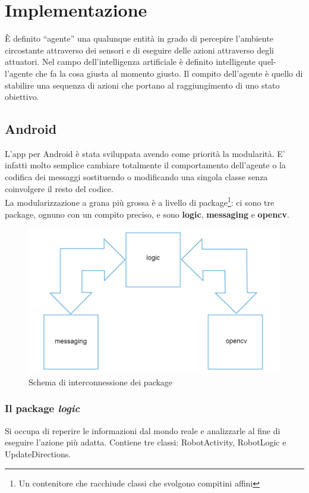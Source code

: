 \chapter{Implementazione}
\fancyfoot[C]{\thepage }
È definito ``agente'' una qualunque entità in grado di percepire l'ambiente
circostante attraverso dei sensori e di eseguire delle azioni attraverso degli
attuatori. Nel campo dell'intelligenza artificiale è definito intelligente quel-
l'agente che fa la cosa giusta al momento giusto. Il compito dell'agente è
quello di stabilire una sequenza di azioni che portano al raggiungimento di
uno stato obiettivo.\cite{agente}
\section {Android}
L'app per Android è stata sviluppata avendo come priorità la modularità. E' 
infatti molto semplice cambiare totalmente il comportamento dell'agente o la 
codifica dei messaggi sostituendo o modificando una singola classe senza 
coinvolgere il resto del codice.\\
La modularizzazione a grana più grossa è a livello di package\footnote{Un contenitore 
che racchiude classi che svolgono compitini affini}: ci sono tre package,
ognuno con un compito preciso, e sono \textbf{logic}, \textbf{messaging} e \textbf{opencv}.
\begin{figure}[H] \center
\includegraphics[scale=0.2]{immagini/package_diagram.png}
\caption{Schema di interconnessione dei package} 
\end{figure}
\subsection {Il package \textit{logic}}
Si occupa di reperire le informazioni dal mondo reale e analizzarle al fine di
eseguire l'azione più adatta.
Contiene tre classi: RobotActivity, RobotLogic e UpdateDirections.
